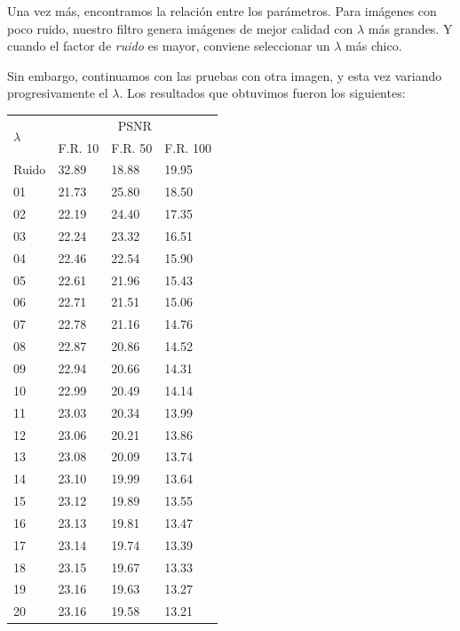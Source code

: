 \documentclass[a4paper]{article}
\begin{document}
Una vez más, encontramos la relación entre los parámetros. Para imágenes con poco ruido, nuestro filtro genera imágenes de mejor calidad con $\lambda$ más grandes. Y cuando el factor de \textit{ruido} es mayor, conviene seleccionar un $\lambda$ más chico.

Sin embargo, continuamos con las pruebas con otra imagen, y esta vez variando progresivamente el $\lambda$. Los resultados que obtuvimos fueron los siguientes: 

\vspace{2em}
\begin{center}
\begin{tabular}{|l|l|l|l|}
  \hline
  \multirow{2}{*}{$\lambda$} & \multicolumn{3}{|c|}{PSNR} \\
  \cline{2-4}
   & F.R. 10 & F.R. 50 & F.R. 100 \\ \hline

  Ruido	 & 	32.89	 & 	18.88	 & 	19.95 \\
  01	 & 	21.73	 & 	25.80	 & 	18.50 \\
  02	 & 	22.19	 & 	24.40	 & 	17.35 \\
  03	 & 	22.24	 & 	23.32	 & 	16.51 \\
  04	 & 	22.46	 & 	22.54	 & 	15.90 \\
  05	 & 	22.61	 & 	21.96	 & 	15.43 \\
  06	 & 	22.71	 & 	21.51	 & 	15.06 \\
  07	 & 	22.78	 & 	21.16	 & 	14.76 \\
  08	 & 	22.87	 & 	20.86	 & 	14.52 \\
  09	 & 	22.94	 & 	20.66	 & 	14.31 \\
  10	 & 	22.99	 & 	20.49	 & 	14.14 \\
  11	 & 	23.03	 & 	20.34	 & 	13.99 \\
  12	 & 	23.06	 & 	20.21	 & 	13.86 \\
  13	 & 	23.08	 & 	20.09	 & 	13.74 \\
  14	 & 	23.10	 & 	19.99	 & 	13.64 \\
  15	 & 	23.12	 & 	19.89	 & 	13.55 \\
  16	 & 	23.13	 & 	19.81	 & 	13.47 \\
  17	 & 	23.14	 & 	19.74	 & 	13.39 \\
  18	 & 	23.15	 & 	19.67	 & 	13.33 \\
  19	 & 	23.16	 & 	19.63	 & 	13.27 \\
  20	 & 	23.16	 & 	19.58	 & 	13.21 \\
  \hline
\end{tabular}
\end{center}
\end{document}
